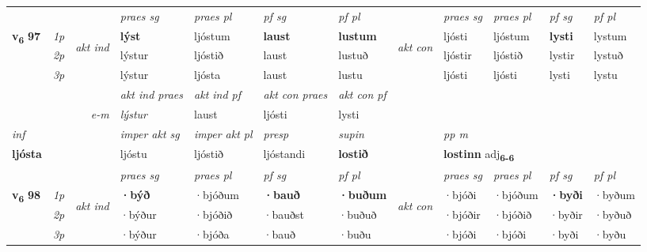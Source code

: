\begin{longtable}[l]{X>{\footnotesize\itshape}llXXXXlXXXX}
 & &   & \textit{praes sg}  & \textit{praes pl}    & \textit{ pf sg} & \textit{pf pl} & & \textit{praes sg}  & \textit{praes pl}    & \textit{pf sg} & \textit{pf pl }  \\ \cmidrule{4-7} \cmidrule{9-12}
 \multirow{2}{*}{{{\textbf{v{\textsubscript{6}}} \Large{\textbf{97}}}}}  & 1p & \multirow{3}{*}{\begin{turn}{90}\textit{akt ind}\end{turn}} & \textbf{lýst} & ljóstum & \textbf{laust} & \textbf{lustum} & \multirow{3}{*}{\begin{turn}{90}\textit{akt con}\end{turn}} &ljósti & ljóstum & \textbf{lysti} & lystum\\*
 & 2p &  &  lýstur  & ljóstið & laust & lustuð & & ljóstir & ljóstið & lystir & lystuð \\*
 & 3p &  & lýstur & ljósta & laust & lustu & & ljósti & ljósti& lysti & lystu \\*
\cmidrule{4-7} \cmidrule{9-12}

   && &  \textit{akt ind praes} & \textit{akt ind pf} & \textit{akt con praes} & \textit{akt con pf} \\*
\multicolumn{3}{r}{\textit{e-m}} & lýstur & laust & ljósti & lysti \\*

\cmidrule{4-7}
   {\textit{inf}} & &  & \textit{imper akt sg} & \textit{imper akt pl}   & \textit{presp} & \textit{supin}  && \textit{pp m} \\*
  {\textbf{ljósta}} & && ljóstu  & ljóstið   & ljóstandi &  \textbf{lostið}  && \multicolumn{2}{l}{\textbf{lostinn} adj\textbf{\textsubscript{6-6}}} \\*

\midrule

 & &   & \textit{praes sg}  & \textit{praes pl}    & \textit{ pf sg} & \textit{pf pl} & & \textit{praes sg}  & \textit{praes pl}    & \textit{pf sg} & \textit{pf pl }  \\ \cmidrule{4-7} \cmidrule{9-12}
 \multirow{2}{*}{{{\textbf{v{\textsubscript{6}}} \Large{\textbf{98}}}}}  & 1p & \multirow{3}{*}{\begin{turn}{90}\textit{akt ind}\end{turn}} & \textbf{·býð} & ·bjóðum & \textbf{·bauð} & \textbf{·buðum} & \multirow{3}{*}{\begin{turn}{90}\textit{akt con}\end{turn}} &·bjóði & ·bjóðum & \textbf{·byði} & ·byðum\\*
 & 2p &  &  ·býður  & ·bjóðið & ·bauðst & ·buðuð & & ·bjóðir & ·bjóðið & ·byðir & ·byðuð \\*
 & 3p &  & ·býður & ·bjóða & ·bauð & ·buðu & & ·bjóði & ·bjóði& ·byði & ·byðu \\*
\cmidrule{4-7} \cmidrule{9-12}


\end{longtable}
